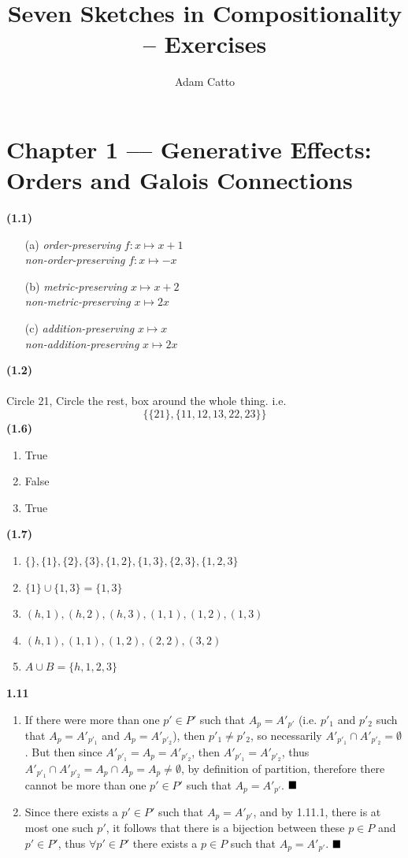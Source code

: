 \documentclass{article}
\title{Seven Sketches in Compositionality – Exercises}
\author{Adam Catto}
\date{}
\begin{document}
\maketitle
\section{Chapter 1 –– Generative Effects: Orders and Galois Connections}
\textbf{(1.1)}
\begin{itemize}
\item[(a)] 
\textit{order-preserving}  $f: x\mapsto x+1$\\
\textit{non-order-preserving}  $f: x\mapsto -x$
\item[(b)] \textit{metric-preserving} $x\mapsto x+2$\\
\textit{non-metric-preserving} $x\mapsto 2x$
\item[(c)] \textit{addition-preserving} $x\mapsto x$\\
\textit{non-addition-preserving} $x\mapsto 2x$
\end{itemize}\bigskip
\textbf{(1.2)}\\
 \\
 Circle 21, Circle the rest, box around the whole thing. i.e.
 $$\{ \{ 21 \}, \{ 11,12,13,22,23 \} \}$$\bigskip
\textbf{(1.6)}
\begin{enumerate}
	\item True
	\item False
	\item True
\end{enumerate}\bigskip
\textbf{(1.7)}
\begin{enumerate}
	\item $\{ \}, \{ 1\}, \{ 2\}, \{ 3\}, \{ 1,2\}, \{1,3\}, \{ 2,3\}, \{ 1,2,3\}$
	\item $\{ 1\} \cup \{ 1,3\} = \{ 1,3\}$
	\item $(h,1),(h,2),(h,3),(1,1),(1,2),(1,3)$
	\item $(h,1),(1,1),(1,2),(2,2),(3,2)$
	\item $A\cup B = \{ h,1,2,3\}$
\end{enumerate}\bigskip
\textbf{1.11}
\begin{enumerate}
	\item If there were more than one $p'\in P'$ such that $A_p=A'_{p'}$ (i.e. $p'_1$ and $p'_2$ such that $A_p=A'_{p'_1}$ and $A_p=A'_{p'_2}$), then $p'_1\neq p'_2$, so necessarily $A'_{p'_1} \cap A'_{p'_2}=\emptyset$. But then since $A'_{p'_1}=A_p=A'_{p'_2}$, then $A'_{p'_1}=A'_{p'_2}$, thus $A'_{p'_1}\cap A'_{p'_2} = A_p\cap A_p = A_p\neq \emptyset$, by definition of partition, therefore there cannot be more than one $p'\in P'$ such that $A_p=A'_{p'}$. $\hfill \blacksquare$
	\item Since there exists a $p'\in P'$ such that $A_p=A'_{p'}$, and by 1.11.1, there is at most one such $p'$, it follows that there is a bijection between these $p\in P$ and $p'\in P'$, thus $\forall p'\in P'$ there exists a $p\in P$ such that $A_p=A'_{p'}$. $\hfill \blacksquare$
\end{enumerate}\bigskip
\end{document}

